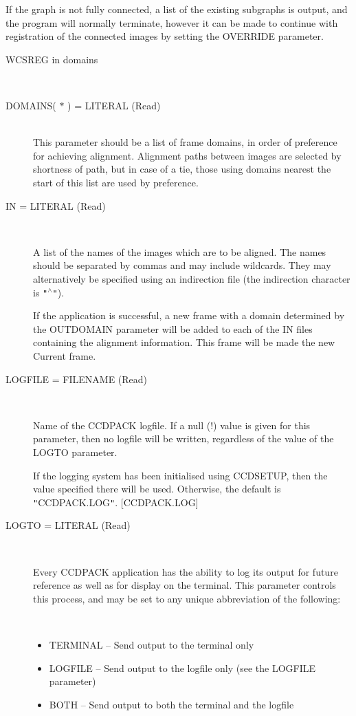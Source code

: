 \documentclass[twoside,11pt]{article}
\newcommand{\htmlref}[2]{#1}
\renewcommand{\_}{\texttt{\symbol{95}}}
\newcommand{\qt}[1]{{\tt "}#1{\tt "}}
\newcommand{\xroutine}[1]{\htmlref{{\sc #1}}{#1}}
\newcommand{\sstusage}[1]{\item[Usage:] \mbox{}
   \begin{description}
      {\ssttt \item #1}
   \end{description}
}
\newcommand{\sstparameters}[1]{
   \item[Parameters:] \mbox{} \\
   \vspace{-3.5ex}
   \begin{description}
      #1
   \end{description}
}
\newcommand{\sstsubsection}[1]{ \item[{#1}] \mbox{} \\}
\newcommand{\sstitemlist}[1]{
  \mbox{} \\
  \vspace{-3.5ex}
  \begin{itemize}
     #1
  \end{itemize}
}
\newcommand{\sstitem}{\item}
\newcommand{\sstusage}[1]{\item[Usage:]
      \begin{description}
         {\ssttt #1}
      \end{description}
      \\
   }
\newcommand{\sstparameters}[1]{
      \item[Parameters:] \\
      \begin{description}
         #1
      \end{description}
      \\
   }
\newcommand{\sstsubsection}[1]{\item[{#1}]}
\newcommand{\sstitemlist}[1]{
      \begin{itemize}
         #1
      \end{itemize}
      \\
   }
\newcommand{\sstitem}{\item}
\begin{document}
{{      If the graph is not fully connected, a list of the existing
      subgraphs is output, and the program will normally terminate,
      however it can be made to continue with registration of the
      connected images by setting the OVERRIDE parameter.
   }
   \sstusage{
      WCSREG in domains
   }
   \sstparameters{
      \sstsubsection{
         DOMAINS( $*$ ) = LITERAL (Read)
      } {
         This parameter should be a list of frame domains, in order
         of preference for achieving alignment.  Alignment paths
         between images are selected by shortness of path, but in case
         of a tie, those using domains nearest the start of this list
         are used by preference.
      }
      \sstsubsection{
         IN = LITERAL (Read)
      } {
          A list of the names of the images which are to be aligned.  The
          names should be separated by commas and may include wildcards.
          They may alternatively be specified using an indirection file
          (the indirection character is \qt{$^\wedge$}).

          If the application is successful, a new frame with a domain
          determined by the OUTDOMAIN parameter will be added to each of
          the IN files containing the alignment information.  This frame 
          will be made the new Current frame.
       }
      \sstsubsection{
         LOGFILE = FILENAME (Read)
      } {
         Name of the CCDPACK logfile.  If a null (!) value is given for
         this parameter, then no logfile will be written, regardless of
         the value of the LOGTO parameter.

         If the logging system has been initialised using \xroutine{CCDSETUP},
         then the value specified there will be used. Otherwise, the
         default is \qt{CCDPACK.LOG}.
         [CCDPACK.LOG]
      }
      \sstsubsection{
         LOGTO = LITERAL (Read)
      } {
         Every CCDPACK application has the ability to log its output
         for future reference as well as for display on the terminal.
         This parameter controls this process, and may be set to any
         unique abbreviation of the following:
         \sstitemlist{

            \sstitem
               TERMINAL  -- Send output to the terminal only

            \sstitem
               LOGFILE   -- Send output to the logfile only (see the
                               LOGFILE parameter)

            \sstitem
               BOTH      -- Send output to both the terminal and the
                               logfile

}}}}
\end{document}
